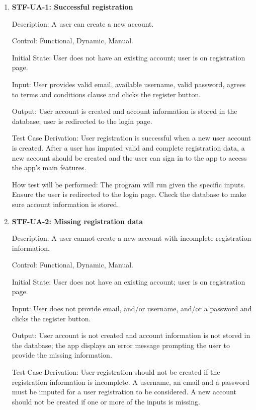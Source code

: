 \documentclass[12pt, titlepage]{article}
\begin{document}
    \begin{enumerate}

        \item{\textbf{STF-UA-1: Successful registration}\\}

        Description: A user can create a new account.

        Control: Functional, Dynamic, Manual.

        Initial State: User does not have an existing account; user is on registration page.

        Input: User provides valid email, available username, valid password, agrees to terms and conditions clause and clicks the register button.

        Output: User account is created and account information is stored in the database; user is redirected to the login page.

        Test Case Derivation: User registration is successful when a new user account is created. After a user has imputed valid and complete registration data, a new account should be created and the user can sign in to the app to access the app’s main features.

        How test will be performed: The program will run given the specific inputs. Ensure the user is redirected to the login page. Check the database to make sure account information is stored.

        \item{\textbf{STF-UA-2: Missing registration data}\\}

        Description: A user cannot create a new account with incomplete registration information.

        Control:  Functional, Dynamic, Manual.

        Initial State: User does not have an existing account; user is on registration page.

        Input: User does not provide email, and/or username, and/or a password and clicks the register button.

        Output: User account is not created and account information is not stored in the database; the app displays an error message prompting the user to provide the missing information.

        Test Case Derivation: User registration should not be created if the registration information is incomplete. A username, an email and a password must be imputed for a user registration to be considered. A new account should not be created if one or more of the inputs is missing.


\end{enumerate}
\end{document}
